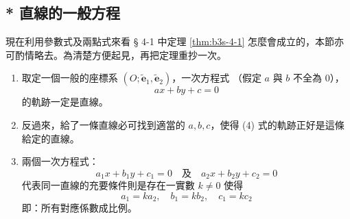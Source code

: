 \subsection{* 直線的一般方程}
\label{sec:4-3}

現在利用參數式及兩點式來看 § 4-1 中定理 \ref{thm:b3s-4-1} 怎麼會成立的，本節亦可酌情略去。為清楚方便起見，再把定理重抄一次。

\begin{theorem*}[定理 1 重述]
\begin{enumerate}[label=(\Roman*), leftmargin=2em]
  \item 取定一個一般的座標系 $(O; \tilde{\mathbf{e}}_1, \tilde{\mathbf{e}}_2)$，一次方程式
  （假定 $a$ 與 $b$ 不全為 0），
  \begin{equation}
  ax + by + c = 0
  \tag{4}
  \end{equation}
  的軌跡一定是直線。
  \item 反過來，給了一條直線必可找到適當的 $a, b, c$，使得 (4) 式的軌跡正好是這條給定的直線。
  \item 兩個一次方程式：
  \[ a_1 x + b_1 y + c_1 = 0 \quad\text{及}\quad a_2 x + b_2 y + c_2 = 0 \]
  代表同一直線的充要條件則是存在一實數 $k \neq 0$ 使得
  \[ a_1 = k a_2, \quad b_1 = k b_2, \quad c_1 = k c_2 \]
  即：所有對應係數成比例。
\end{enumerate}
\end{theorem*}

